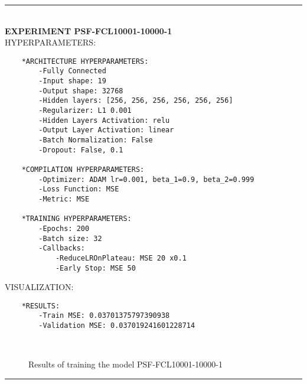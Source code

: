 \rule{0.5\textwidth}{0.5pt}\\

	{\large \textbf{EXPERIMENT PSF-FCL10001-10000-1}}\\
	
	{\normalsize HYPERPARAMETERS:}
	\begin{lstlisting}	
	*ARCHITECTURE HYPERPARAMETERS:
		-Fully Connected
		-Input shape: 19
		-Output shape: 32768
		-Hidden layers: [256, 256, 256, 256, 256, 256]
		-Regularizer: L1 0.001
		-Hidden Layers Activation: relu
		-Output Layer Activation: linear
		-Batch Normalization: False
		-Dropout: False, 0.1
	
	*COMPILATION HYPERPARAMETERS:
		-Optimizer: ADAM lr=0.001, beta_1=0.9, beta_2=0.999
		-Loss Function: MSE
		-Metric: MSE
	
	*TRAINING HYPERPARAMETERS:
		-Epochs: 200
		-Batch size: 32
		-Callbacks: 
			-ReduceLROnPlateau: MSE 20 x0.1
			-Early Stop: MSE 50	
	\end{lstlisting}
	
	{\normalsize VISUALIZATION:}
	\begin{lstlisting}
	*RESULTS:
        -Train MSE: 0.03701375797390938
        -Validation MSE: 0.037019241601228714
	\end{lstlisting}
	
	\begin{figure*}[ht!]
		\hspace{\fill}
		\hspace{\fill}
		\\
		\caption{Results of training the model PSF-FCL10001-10000-1}
	\end{figure*}
	
\FloatBarrier	
\rule{0.5\textwidth}{0.5pt}\\